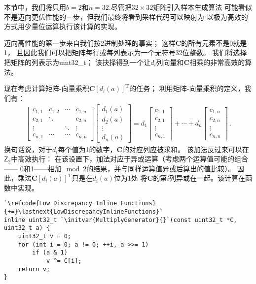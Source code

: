 本节中，我们将只用$b=2$和$n=32$.尽管把$32\times32$矩阵引入样本生成算法
可能看似不是迈向更优性能的一步，但我们最终将看到采样代码可以映射为
以极为高效的方式用少量位运算执行该计算的实现。

迈向高性能的第一步来自我们按2进制处理的事实；
这样$\bm C$的所有元素不是0就是1，
且因此我们可以把矩阵每行或每列表示为一个无符号32位整数。
我们将选择把矩阵的列表示为{\ttfamily uint32\_t}；
该抉择得到一个让$d_i$列向量和$\bm C$相乘的非常高效的算法。

现在考虑计算矩阵-向量乘积${\bm C}[d_i(a)]^{\mathrm{T}}$的任务；
利用矩阵-向量乘积的定义，我们有：
\begin{align}\label{eq:7.10}
    \left[
        \begin{array}{cccc}
            c_{1,1} & c_{1,2} & \cdots & c_{1,n} \\
            c_{2,1} & \ddots  &        & c_{2,n} \\
            \vdots  &         & \ddots & \vdots  \\
            c_{n,1} & \cdots  & \cdots & c_{n,n}
        \end{array}
        \right]\left[
        \begin{array}{c}
            d_1(a) \\
            d_2(a) \\
            \vdots \\
            d_n(a)
        \end{array}
        \right]
    =d_1\left[
        \begin{array}{c}
            c_{1,1} \\
            c_{2,1} \\
            \vdots  \\
            c_{n,1}
        \end{array}
        \right]+\cdots+d_n\left[
        \begin{array}{c}
            c_{1,n} \\
            c_{2,n} \\
            \vdots  \\
            c_{n,n}
        \end{array}
        \right]\, .
\end{align}
换句话说，对于$d_i$每个值为1的数字，$\bm C$的对应列应被求和。
该加法反过来可以在$\mathsf{Z}_2$中高效执行：
在该设置下，加法对应于异或运算（考虑两个运算值可能的组合——
0和1——相加$\mod{2}$的结果，并与同样运算值异或后算出的值比较）。
因此，乘法${\bm C}[d_i(a)]^{\mathrm{T}}$只是在$d_i(a)$位为1处
将$\bm C$的第$i$列异或在一起。该计算在函数中实现。
\begin{lstlisting}
`\refcode{Low Discrepancy Inline Functions}{+=}\lastnext{LowDiscrepancyInlineFunctions}`
inline uint32_t `\initvar{MultiplyGenerator}{}`(const uint32_t *C, uint32_t a) {
    uint32_t v = 0;
    for (int i = 0; a != 0; ++i, a >>= 1)
        if (a & 1)
            v ^= C[i];
    return v;
}
\end{lstlisting}

